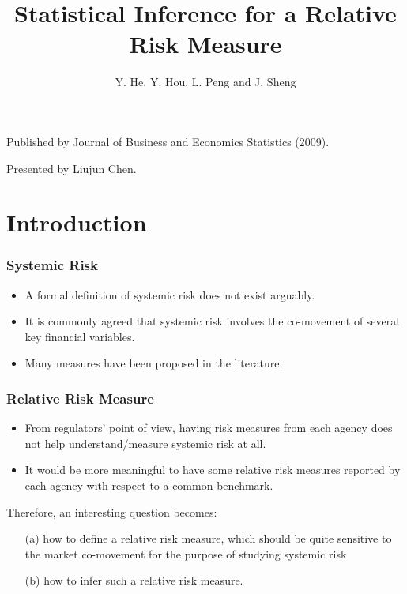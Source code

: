 \documentclass{beamer}
\author{Y. He, Y. Hou, L. Peng and J. Sheng}
\title{Statistical Inference for a Relative Risk Measure}
\begin{document}
\begin{frame}
\titlepage
\vspace{-3ex}
\begin{center}
    Published by Journal of Business and Economics Statistics (2009).

    \bigskip

    Presented by Liujun Chen.
\end{center}
\end{frame}


\section{Introduction}
\begin{frame}
    \frametitle{Systemic Risk}
\begin{itemize}
    \item A formal definition of systemic risk does not exist arguably.
    \bigskip
    \item It is
    commonly agreed that systemic risk involves the co-movement
    of several key financial variables. 
    \bigskip
    \item Many measures have been
    proposed in the literature.
\end{itemize}    

\end{frame}



\begin{frame}
    \frametitle{Relative Risk Measure}
\begin{itemize}
    \item From regulators’ point of view, having risk measures from     each agency does not help understand/measure systemic risk     at all.
  \medskip
    \item It would be more meaningful to have some
    relative risk measures reported by each agency with respect to 
    a common benchmark.
\end{itemize}
    
\bigskip
Therefore, an interesting question becomes:
\medskip
\begin{itemize}
    \item[(a)] how to define a relative risk measure, which should be quite    sensitive to the market co-movement for the purpose of studying    systemic risk
    \medskip
    \item[(b)] how to infer such a relative risk measure. 
\end{itemize}
\end{frame}
\end{document}
